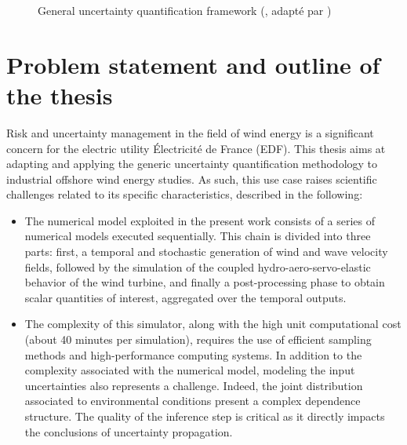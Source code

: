 \begin{figure}[!h]
    \centering
    
    \caption{General uncertainty quantification framework (\cite{rocquigny_2008}, adapté par \cite{ajenjo_2023})}
    \label{fig:UQ_methodo}
\end{figure}


\section*{Problem statement and outline of the thesis}

Risk and uncertainty management in the field of wind energy is a significant concern for the electric utility Électricité de France (EDF). 
This thesis aims at adapting and applying the generic uncertainty quantification methodology to industrial offshore wind energy studies. 
As such, this use case raises scientific challenges related to its specific characteristics, described in the following:
\begin{itemize}
    \item The numerical model exploited in the present work consists of a series of numerical models executed sequentially. 
    This chain is divided into three parts: first, a temporal and stochastic generation of wind and wave velocity fields, 
    followed by the simulation of the coupled hydro-aero-servo-elastic behavior of the wind turbine, 
    and finally a post-processing phase to obtain scalar quantities of interest, aggregated over the temporal outputs. 
    \item The complexity of this simulator, along with the high unit computational cost (about 40 minutes per simulation), requires the use of efficient sampling methods and high-performance computing systems. 
    In addition to the complexity associated with the numerical model, modeling the input uncertainties also represents a challenge. 
    Indeed, the joint distribution associated to environmental conditions present a complex dependence structure.   
    The quality of the inference step is critical as it directly impacts the conclusions of uncertainty propagation.
\end{itemize}

